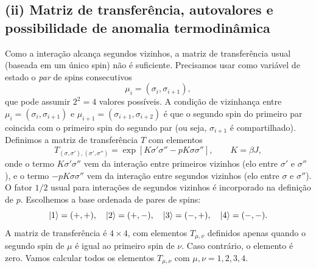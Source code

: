 \documentclass[11pt,a4paper]{article}
\begin{document}
\subsection*{(ii) Matriz de transferência, autovalores e possibilidade de anomalia termodinâmica}
%
Como a interação alcança segundos vizinhos, a matriz de transferência usual (baseada em um único spin) não é suficiente. Precisamos usar como variável de estado o \emph{par} de spins consecutivos 
%
\begin{equation}
    \mu_i = (\sigma_i, \sigma_{i+1}),
\end{equation}
%
que pode assumir \(2^2 = 4\) valores possíveis. A condição de vizinhança entre \(\mu_i = (\sigma_i, \sigma_{i+1})\) e \(\mu_{i+1} = (\sigma_{i+1}, \sigma_{i+2})\) é que o segundo spin do primeiro par coincida com o primeiro spin do segundo par (ou seja, \(\sigma_{i+1}\) é compartilhado). Definimos a matriz de transferência \(T\) com elementos
%
\begin{equation}
    T_{(\sigma,\sigma'),(\sigma',\sigma'')} = \exp\left[ K \sigma' \sigma'' - pK \sigma \sigma'' \right],
    \qquad K = \beta J,
    \label{eq:T_annni_element}
\end{equation}
%
onde o termo \(K \sigma' \sigma''\) vem da interação entre primeiros vizinhos (elo entre \(\sigma'\) e \(\sigma''\)), e o termo \(-pK \sigma \sigma''\) vem da interação entre segundos vizinhos (elo entre \(\sigma\) e \(\sigma''\)). O fator \(1/2\) usual para interações de segundos vizinhos é incorporado na definição de \(p\).
%
Escolhemos a base ordenada de pares de spins:
%
\begin{equation}
    \ket{1} = (+,+), \quad
    \ket{2} = (+,-), \quad
    \ket{3} = (-,+), \quad
    \ket{4} = (-,-).
\end{equation}
%
A matriz de transferência é \(4 \times 4\), com elementos \(T_{\mu,\nu}\) definidos apenas quando o segundo spin de \(\mu\) é igual ao primeiro spin de \(\nu\). Caso contrário, o elemento é zero. Vamos calcular todos os elementos \(T_{\mu,\nu}\) com \(\mu, \nu = 1,2,3,4\).
%
\end{document}
